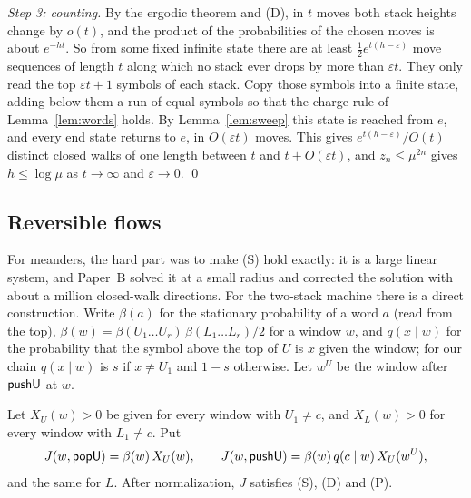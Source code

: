 \emph{Step 3: counting.} By the ergodic theorem and (D), in $t$ moves both stack heights change by $o(t)$, and the
product of the probabilities of the chosen moves is about $e^{-ht}$. So from some fixed infinite state there are at
least $\frac12e^{t(h-\varepsilon)}$ move sequences of length $t$ along which no stack ever drops by more than
$\varepsilon t$. They only read the top $\varepsilon t+1$ symbols of each stack. Copy those symbols into a finite
state, adding below them a run of equal symbols so that the charge rule of Lemma~\ref{lem:words} holds. By
Lemma~\ref{lem:sweep} this state is reached from $e$, and every end state returns to $e$, in $O(\varepsilon t)$ moves.
This gives $e^{t(h-\varepsilon)}/O(t)$ distinct closed walks of one length between $t$ and $t+O(\varepsilon t)$, and
$z_n\le\mu^{2n}$ gives $h\le\log\mu$ as $t\to\infty$ and $\varepsilon\to0$. \qed

\subsection{Reversible flows}

For meanders, the hard part was to make (S) hold exactly: it is a large linear system, and Paper~B solved it at a
small radius and corrected the solution with about a million closed-walk directions. For the two-stack machine there
is a direct construction. Write $\beta(a)$ for the stationary probability of a word $a$ (read from the top),
$\beta(w)=\beta(U_1\ldots U_r)\,\beta(L_1\ldots L_r)/2$ for a window $w$, and $q(x\mid w)$ for the probability that
the symbol above the top of $U$ is $x$ given the window; for our chain $q(x\mid w)$ is $s$ if $x\neq U_1$ and $1-s$
otherwise. Let $w^U$ be the window after $\mathsf{pushU}$ at $w$.

\begin{proposition}\label{prop:rev}
Let $X_U(w)>0$ be given for every window with $U_1\ne c$, and $X_L(w)>0$ for every window with $L_1\ne c$. Put
\[ J(w,\mathsf{popU})=\beta(w)\,X_U(w),\qquad J(w,\mathsf{pushU})=\beta(w)\,q(c\mid w)\,X_U(w^U), \]
and the same for $L$. After normalization, $J$ satisfies (S), (D) and (P).
\end{proposition}

